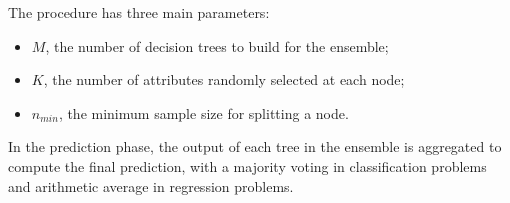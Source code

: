 The procedure has three main parameters: 
\begin{itemize}
    \item $M$, the number of decision trees to build for the ensemble;
    \item $K$, the number of attributes randomly selected at each node;
    \item $n_{min}$, the minimum sample size for splitting a node. 
\end{itemize}
In the prediction phase, the output of each tree in the ensemble is aggregated
to compute the final prediction, with a majority voting in classification 
problems and arithmetic average in regression problems.


























